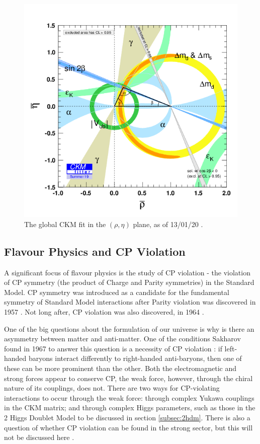 \documentclass[a4paper,12pt]{article}
\begin{document}
\begin{figure}[H]
    \centering
    \includegraphics[scale=0.5]{rhoeta_large.png}
    \caption{\label{fig:ckmfitter} The global CKM fit in the $(\rho,\eta)$ plane, as of 13/01/20 \cite{g}.}
\end{figure}

\subsection{Flavour Physics and CP Violation}
\label{subsec:flavobs}
A significant focus of flavour physics is the study of CP violation - the violation of CP symmetry (the product of Charge and Parity symmetries) in the Standard Model.
CP symmetry was introduced as a candidate for the fundamental symmetry of Standard Model interactions after Parity violation was discovered in 1957 \cite{wu}.
Not long after, CP violation was also discovered, in 1964 \cite{cpv}.

One of the big questions about the formulation of our universe is why is there an asymmetry between matter and anti-matter. 
One of the conditions Sakharov found in 1967 to answer this question is a necessity of CP violation \cite{h}: if left-handed baryons interact differently to right-handed anti-baryons, then one of these can be more prominent than the other. 
Both the electromagnetic and strong forces appear to conserve CP, the weak force, however, through the chiral nature of its couplings, does not.
There are two ways for CP-violating interactions to occur through the weak force: through complex Yukawa couplings in the CKM matrix; and through complex Higgs parameters, such as those in the 2 Higgs Doublet Model to be discussed in section \ref{subsec:2hdm}.
There is also a question of whether CP violation can be found in the strong sector, but this will not be discussed here \cite{m}.
\end{document}
